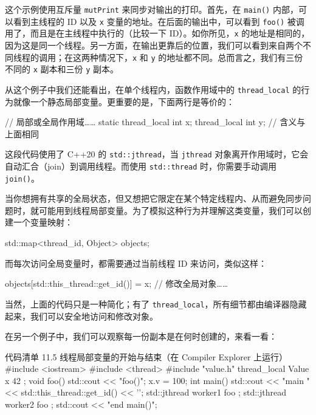 这个示例使用互斥量 \texttt{mutPrint} 来同步对输出的打印。首先，在 \texttt{main()} 内部，可以看到主线程的 ID 以及 \texttt{x} 变量的地址。在后面的输出中，可以看到 \texttt{foo()} 被调用了，而且是在主线程中执行的（比较一下 ID）。如你所见，\texttt{x} 的地址是相同的，因为这是同一个线程。另一方面，在输出更靠后的位置，我们可以看到来自两个不同线程的调用；在这两种情况下，\texttt{x} 和 \texttt{y} 的地址都不同。总而言之，我们有三份不同的 \texttt{x} 副本和三份 \texttt{y} 副本。

从这个例子中我们还能看出，在单个线程内，函数作用域中的 \texttt{thread\_local} 的行为就像一个静态局部变量。更重要的是，下面两行是等价的：

\begin{codebox}[cpp]
// 局部或全局作用域……
static thread_local int x;
thread_local int y;
// 含义与上面相同
\end{codebox}

\begin{myInfoBox}
这段代码使用了 C++20 的 \texttt{std::jthread}，当 \texttt{jthread} 对象离开作用域时，它会自动汇合（join）到调用线程。而使用 \texttt{std::thread} 时，你需要手动调用 \texttt{join()}。
\end{myInfoBox}

当你想拥有共享的全局状态，但又想把它限定在某个特定线程内、从而避免同步问题时，就可能用到线程局部变量。为了模拟这种行为并理解这类变量，我们可以创建一个变量映射：

\begin{codebox}[cpp]
std::map<thread_id, Object> objects;
\end{codebox}

而每次访问全局变量时，都需要通过当前线程 ID 来访问，类似这样：

\begin{codebox}[cpp]
objects[std::this_thread::get_id()] = x; // 修改全局对象……
\end{codebox}

当然，上面的代码只是一种简化；有了 \texttt{thread\_local}，所有细节都由编译器隐藏起来，我们可以安全地访问和修改对象。

在另一个例子中，我们可以观察每一份副本是在何时创建的，来看一看：


\begin{codeboxt}[cpp]{代码清单 11.5 线程局部变量的开始与结束（在 Compiler Explorer 上运行）}
#include <iostream>
#include <thread>
#include "value.h"
thread_local Value x { 42 };
void foo() {
std::cout << "foo()\n";
x.v = 100;
}
int main() {
std::cout << "main " << std::this_thread::get_id() << '\n';
{
std::jthread worker1 { foo };
std::jthread worker2 { foo };
}
std::cout << "end main()\n";
}
\end{codeboxt}

